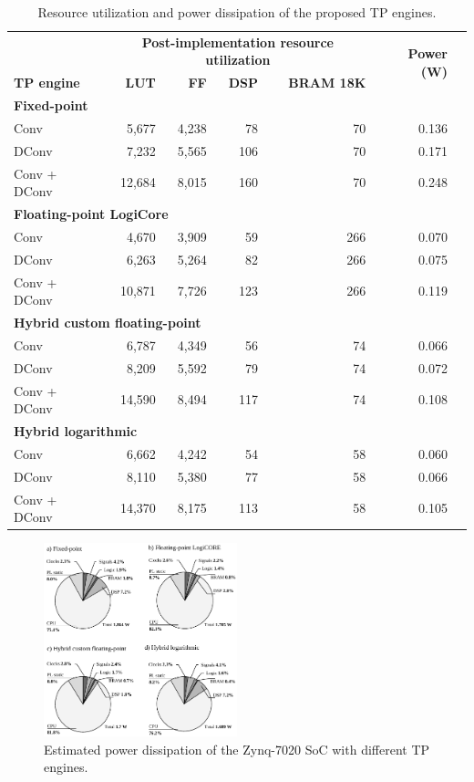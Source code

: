 \begin{table}[!htp]\centering
	\caption{Resource utilization and power dissipation of the proposed TP engines.}\label{tab:resource}
	\scriptsize
\begin{tabular}{lrrrrrr}\toprule
	\textbf{} &\multicolumn{4}{c}{\textbf{Post-implementation resource utilization}} &\multirow{2}{*}{\textbf{Power (W)}} \\\cmidrule{2-5}
	\textbf{TP engine} &\textbf{LUT} &\textbf{FF} &\textbf{DSP} &\textbf{BRAM 18K} & \\\midrule
	\multicolumn{6}{l}{\textbf{Fixed-point}} \\
	Conv &5,677 &4,238 &78 &70 &0.136 \\
	DConv &7,232 &5,565 &106 &70 &0.171 \\
	Conv + DConv &12,684 &8,015 &160 &70 &0.248 & \\\midrule
	\multicolumn{6}{l}{\textbf{Floating-point LogiCore}} \\
	Conv &4,670 &3,909 &59 &266 &0.070 \\
	DConv &6,263 &5,264 &82 &266 &0.075 \\
	Conv + DConv &10,871 &7,726 &123 &266 &0.119 \\\midrule
	\multicolumn{6}{l}{\textbf{Hybrid custom floating-point}} \\
	Conv &6,787 &4,349 &56 &74 &0.066 \\
	DConv &8,209 &5,592 &79 &74 &0.072 \\
	Conv + DConv &14,590 &8,494 &117 &74 &0.108 & \\\midrule
	\multicolumn{6}{l}{\textbf{Hybrid logarithmic}} \\
	Conv &6,662 &4,242 &54 &58 &0.060 \\
	DConv &8,110 &5,380 &77 &58 &0.066 \\
	Conv + DConv &14,370 &8,175 &113 &58 &0.105 \\
	\bottomrule
\end{tabular}
\end{table}

\begin{figure}[t!]
	\centering
	\includegraphics[width=0.5\textwidth]{../figures/power_breackdown.pdf}
	\caption{Estimated power dissipation of the Zynq-7020 SoC with different TP engines.}
	\label{fig:power}
\end{figure}

